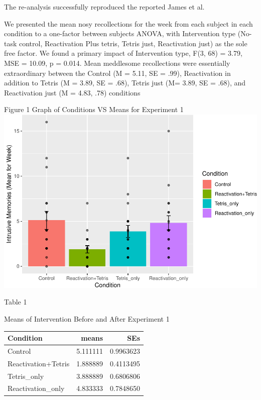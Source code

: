 \documentclass[man]{apa6}
\begin{document}
The re-analysis successfully reproduced the reported James et al.

We presented the mean nosy recollections for the week from each subject
in each condition to a one-factor between subjects ANOVA, with
Intervention type (No-task control, Reactivation Plus tetris, Tetris
just, Reactivation just) as the sole free factor. We found a primary
impact of Intervention type, F(3, 68) = 3.79, MSE = 10.09, p = 0.014.
Mean meddlesome recollections were essentially extraordinary between the
Control (M = 5.11, SE = .99), Reactivation in addition to Tetris (M =
3.89, SE = .68), Tetris just (M= 3.89, SE = .68), and Reactivation just
(M = 4.83, .78) conditions

\newpage

Figure 1 Graph of Conditions VS Means for Experiment 1
\includegraphics{testMidterm_files/figure-latex/unnamed-chunk-2-1.pdf}

\newpage

Table 1

Means of Intervention Before and After Experiment 1

\begin{tabular}{l|r|r}
\hline
Condition & means & SEs\\
\hline
Control & 5.111111 & 0.9963623\\
\hline
Reactivation+Tetris & 1.888889 & 0.4113495\\
\hline
Tetris\_only & 3.888889 & 0.6806806\\
\hline
Reactivation\_only & 4.833333 & 0.7848650\\
\hline
\end{tabular}

\newpage
\end{document}
